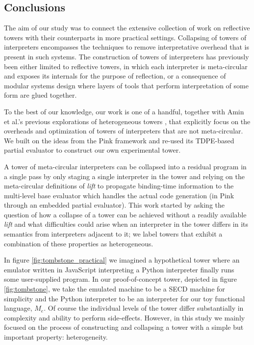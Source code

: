 \documentclass[a4paper,12pt,twoside,openright]{report}
\theoremstyle{definition}
\newcommand{\mevl}{$M_{e}$}
\begin{document}
\subsection{Conclusions}
The aim of our study was to connect the extensive collection of work on reflective towers with their counterparts in more practical settings. Collapsing of towers of interpreters encompasses the techniques to remove interpretative overhead that is present in such systems. The construction of towers of interpreters has previously been either limited to reflective towers, in which each interpreter is meta-circular and exposes its internals for the purpose of reflection, or a consequence of modular systems design where layers of tools that perform interpretation of some form are glued together.

To the best of our knowledge, our work is one of a handful, together with Amin et al.'s previous explorations of heterogeneous towers \cite{amin2017collapsing}, that explicitly focus on the overheads and optimization of towers of interpreters that are not meta-circular. We built on the ideas from the Pink framework and re-used its TDPE-based partial evaluator to construct our own experimental tower.

A tower of meta-circular interpreters can be collapsed into a residual program in a single pass by only staging a single interpreter in the tower and relying on the meta-circular definitions of \textit{lift} to propagate binding-time information to the multi-level base evaluator which handles the actual code generation (in Pink through an embedded partial evaluator). This work started by asking the question of how a collapse of a tower can be achieved without a readily available \textit{lift} and what difficulties could arise when an interpreter in the tower differs in its semantics from interpreters adjacent to it; we label towers that exhibit a combination of these properties as heterogeneous.

In figure \ref{fig:tombstone_practical} we imagined a hypothetical tower where an emulator written in JavaScript interpreting a Python interpreter finally runs some user-supplied program. In our proof-of-concept tower, depicted in figure \ref{fig:tombstone}, we take the emulated machine to be a SECD machine for simplicity and the Python interpreter to be an interpreter for our toy functional language, \mevl. Of course the individual levels of the tower differ substantially in complexity and ability to perform side-effects. However, in this study we mainly focused on the process of constructing and collapsing a tower with a simple but important property: heterogeneity.
\end{document}

